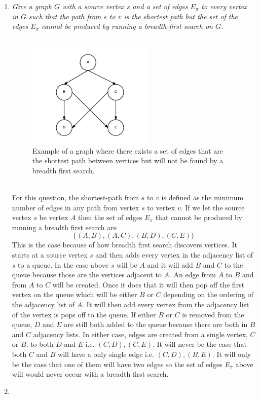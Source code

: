 \documentclass[12pt]{article}
\begin{document}
\begin{enumerate}
\begin{enumerate}
	\end{enumerate}
	\newpage
	\item \textit{Give a graph $G$ with a source vertex $s$ and a set of edges $E_\pi$ to every vertex in $G$ such that the path from $s$ to $v$ is the shortest
	path but the set of the edges $E_\pi$ cannot be produced by running a breadth-first search on $G$.} \\
	\\
	\begin{figure}[h]
	\caption{Example of a graph where there exists a set of edges that are the shortest path between vertices but will not be found by a breadth first search.}
	\includegraphics[width=6cm]{ps2_q2.png}
	\centering
	\end{figure}
	\\
	For this question, the shortest-path from $s$ to $v$ is defined as the minimum number of edges in any path from vertex $s$ to vertex $v$.  
	If we let the source vertex $s$ be vertex $A$ then the set of edges $E_\pi$ that cannot be produced by running a breadth first search are
	$$
	\{(A,B),(A,C),(B,D),(C,E)\}
	$$
	This is the case because of how breadth first search discovers vertices.  It starts at a source vertex $s$ and then adds every vertex in the adjacency list of $s$ to a queue.  
	In the case above $s$ will be $A$ and it will add $B$ and $C$ to the queue because those are the vertices adjacent to $A$.  
	An edge from $A$ to $B$ and from $A$ to $C$ will be created.  
	Once it does that it will then pop off the first vertex on the queue which will be either $B$ or $C$ depending on the ordering of the adjacency list of $A$.  
	It will then add every vertex from the adjacency list of the vertex is pops off to the queue.
	If either $B$ or $C$ is removed from the queue, $D$ and $E$ are still both added to the queue because there are both in $B$ and $C$ adjacency lists.
	In either case, edges are created from a single vertex, $C$ or $B$, to both $D$ and $E$ i.e. $(C,D),(C,E)$.  It will never be the case that both $C$ and $B$ will have a only single edge i.e. $(C,D),(B,E)$.
	It will only be the case that one of them will have two edges so the set of edges $E_\pi$ above will would never occur with a breadth first search.
	\newpage
	\item


\end{enumerate}
\end{document}
